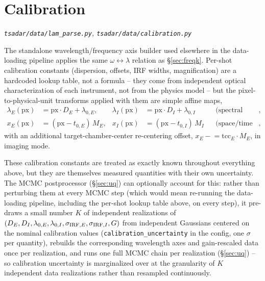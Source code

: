 \documentclass[11pt]{article}
\newcommand{\code}[1]{\texttt{#1}}
\newcommand{\file}[1]{\texttt{#1}}
\begin{document}
\section{Calibration}\label{sec:calibration}
\textit{\file{tsadar/data/lam\_parse.py}, \file{tsadar/data/calibration.py}}

The standalone wavelength/frequency axis builder used elsewhere in the data-loading
pipeline applies the same $\omega\leftrightarrow\lambda$ relation as \S\ref{sec:freqk}.
Per-shot calibration constants (dispersion, offsets, IRF widths, magnification) are a
hardcoded lookup table, not a formula -- they come from independent optical
characterization of each instrument, not from the physics model -- but the
pixel-to-physical-unit transforms applied with them are simple affine maps,
\begin{align}
  \lambda_E(\mathrm{px}) &= \mathrm{px}\cdot D_E+\lambda_{0,E}, &
  \lambda_I(\mathrm{px}) &= \mathrm{px}\cdot D_I+\lambda_{0,I} &&\text{(spectral dispersion)}, \\
  x_E(\mathrm{px}) &= (\mathrm{px}-t_{0,E})\,M_E, &
  x_I(\mathrm{px}) &= (\mathrm{px}-t_{0,I})\,M_I &&\text{(space/time axis)},
\end{align}
with an additional target-chamber-center re-centering offset, $x_E\mathrel{-}=
\mathrm{tcc}_E\cdot M_E$, in imaging mode.

These calibration constants are treated as exactly known throughout everything above, but
they are themselves measured quantities with their own uncertainty. The MCMC postprocessor
(\S\ref{sec:uq}) can optionally account for this: rather than perturbing them at every MCMC
step (which would mean re-running the data-loading pipeline, including the per-shot lookup
table above, on every step), it pre-draws a small number $K$ of independent realizations of
$(D_E,D_I,\lambda_{0,E},\lambda_{0,I},\sigma_{{\rm IRF},E},\sigma_{{\rm IRF},I},G)$ from
independent Gaussians centered on the nominal calibration values (\code{calibration\_uncertainty}
in the config, one $\sigma$ per quantity), rebuilds the corresponding wavelength axes and
gain-rescaled data once per realization, and runs one full MCMC chain per realization
(\S\ref{sec:uq}) -- so calibration uncertainty is marginalized over at the granularity of
$K$ independent data realizations rather than resampled continuously.

\end{document}
